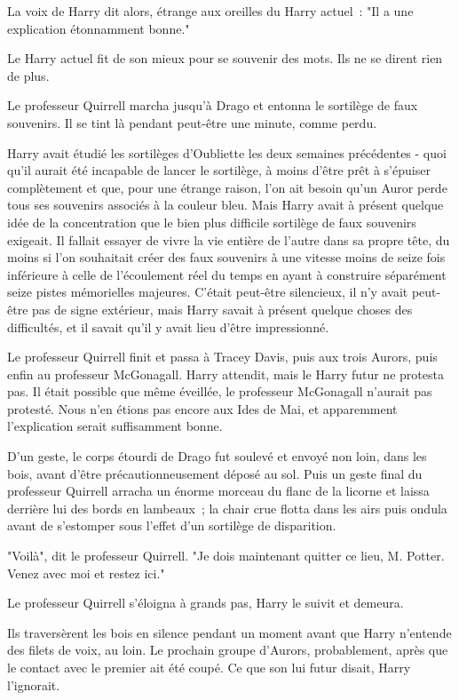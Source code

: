 La voix de Harry dit alors, étrange aux oreilles du Harry actuel~: "Il a une explication étonnamment bonne."

Le Harry actuel fit de son mieux pour se souvenir des mots. Ils ne se dirent rien de plus.

Le professeur Quirrell marcha jusqu'à Drago et entonna le sortilège de faux souvenirs. Il se tint là pendant peut-être une minute, comme perdu.

Harry avait étudié les sortilèges d'Oubliette les deux semaines précédentes - quoi qu'il aurait été incapable de lancer le sortilège, à moins d'être prêt à s'épuiser complètement et que, pour une étrange raison, l'on ait besoin qu'un Auror perde tous ses souvenirs associés à la couleur bleu. Mais Harry avait à présent quelque idée de la concentration que le bien plus difficile sortilège de faux souvenirs exigeait. Il fallait essayer de vivre la vie entière de l'autre dans sa propre tête, du moins si l'on souhaitait créer des faux souvenirs à une vitesse moins de seize fois inférieure à celle de l'écoulement réel du temps en ayant à construire séparément seize pistes mémorielles majeures. C'était peut-être silencieux, il n'y avait peut-être pas de signe extérieur, mais Harry savait à présent quelque choses des difficultés, et il savait qu'il y avait lieu d'être impressionné.

Le professeur Quirrell finit et passa à Tracey Davis, puis aux trois Aurors, puis enfin au professeur McGonagall. Harry attendit, mais le Harry futur ne protesta pas. Il était possible que même éveillée, le professeur McGonagall n'aurait pas protesté. Nous n'en étions pas encore aux Ides de Mai, et apparemment l'explication serait suffisamment bonne.

D'un geste, le corps étourdi de Drago fut soulevé et envoyé non loin, dans les bois, avant d'être précautionneusement déposé au sol. Puis un geste final du professeur Quirrell arracha un énorme morceau du flanc de la licorne et laissa derrière lui des bords en lambeaux~; la chair crue flotta dans les airs puis ondula avant de s'estomper sous l'effet d'un sortilège de disparition.

"Voilà", dit le professeur Quirrell. "Je dois maintenant quitter ce lieu, M. Potter. Venez avec moi et restez ici."

Le professeur Quirrell s'éloigna à grands pas, Harry le suivit et demeura.

Ils traversèrent les bois en silence pendant un moment avant que Harry n'entende des filets de voix, au loin. Le prochain groupe d'Aurors, probablement, après que le contact avec le premier ait été coupé. Ce que son lui futur disait, Harry l'ignorait.

